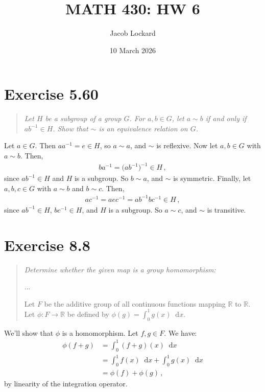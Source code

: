 \documentclass{article}
\renewcommand*\diff{\mathop{}\!\mathrm{d}}
\begin{document}
\title{MATH 430: HW 6}
\author{Jacob Lockard}
\date{10 March 2026}

\maketitle

\section*{Exercise 5.60}

\begin{quote}
    \itshape
    Let $H$ be a subgroup of a group $G$. For $a, b \in G$,
    let $a \sim b$ if and only if $ab^{-1} \in H$.
    Show that $\sim$ is an equivalence relation on $G$.
\end{quote}

Let $a \in G$. Then $aa^{-1} = e \in H$, so $a \sim a$, and
$\sim$ is reflexive.
Now let $a, b \in G$ with $a \sim b$. Then,
\begin{align*}
    ba^{-1} = \bigl(ab^{-1}\bigr)^{-1} \in H \,,
\end{align*}
since $ab^{-1} \in H$ and $H$ is a subgroup.
So $b \sim a$, and $\sim$ is symmetric.
Finally, let $a, b, c \in G$ with $a \sim b$ and $b \sim c$. Then,
\begin{align*}
    ac^{-1} = aec^{-1} = a b^{-1} b c^{-1} \in H \,,
\end{align*}
since $ab^{-1} \in H$, $bc^{-1} \in H$, and $H$ is a subgroup.
So $a \sim c$, and $\sim$ is transitive.
\qedsymbol

\section*{Exercise 8.8}

\begin{quote}
    \itshape
    Determine whether the given map is a group homomorphism:

    ...

    Let $F$ be the additive group of all continuous functions mapping
    $\mathbb{R}$ to $\mathbb{R}$. Let $\phi : F \to \mathbb{R}$ be
    defined by $\phi(g) = \int_0^1 g(x) \diff x$.
\end{quote}

We'll show that $\phi$ is a homomorphism. Let $f, g \in F$.
We have:
\begin{align*}
    \phi(f + g) &= \int_0^1 (f+g)(x) \diff x \\
    &= \int_0^1 f(x) \diff x + \int_0^1 g(x) \diff x \\
    &= \phi(f) + \phi(g) \,,
\end{align*}
by linearity of the integration operator. \qedsymbol
\end{document}
